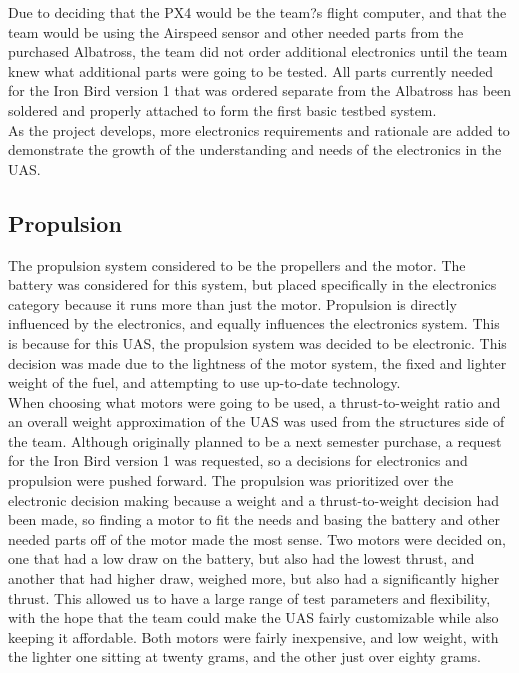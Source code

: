 \documentclass{article}
\begin{document}
\noindent Due to deciding that the PX4 would be the team?s flight computer, and that the team would be using the Airspeed sensor and other needed parts from the purchased Albatross, the team did not order additional electronics until the team knew what additional parts were going to be tested. All parts currently needed for the Iron Bird version 1 that was ordered separate from the Albatross has been soldered and properly attached to form the first basic testbed system. \\

\noindent As the project develops, more electronics requirements and rationale are added to demonstrate the growth of the understanding and needs of the electronics in the UAS. \\

\subsection{Propulsion}
\noindent The propulsion system considered to be the propellers and the motor. The battery was considered for this system, but placed specifically in the electronics category because it runs more than just the motor. Propulsion is directly influenced by the electronics, and equally influences the electronics system. This is because for this UAS, the propulsion system was decided to be electronic. This decision was made due to the lightness of the motor system, the fixed and lighter weight of the fuel, and attempting to use up-to-date technology. \\

\noindent When choosing what motors were going to be used, a thrust-to-weight ratio and an overall weight approximation of the UAS was used from the structures side of the team. Although originally planned to be a next semester purchase, a request for the Iron Bird version 1 was requested, so a decisions for electronics and propulsion were pushed forward. The propulsion was prioritized over the electronic decision making because a weight and a thrust-to-weight decision had been made, so finding a motor to fit the needs and basing the battery and other needed parts off of the motor made the most sense. Two motors were decided on, one that had a low draw on the battery, but also had the lowest thrust, and another that had higher draw, weighed more, but also had a significantly higher thrust. This allowed us to have a large range of test parameters and flexibility, with the hope that the team could make the UAS fairly customizable while also keeping it affordable. Both motors were fairly inexpensive, and low weight, with the lighter one sitting at twenty grams, and the other just over eighty grams. \\
\end{document}

